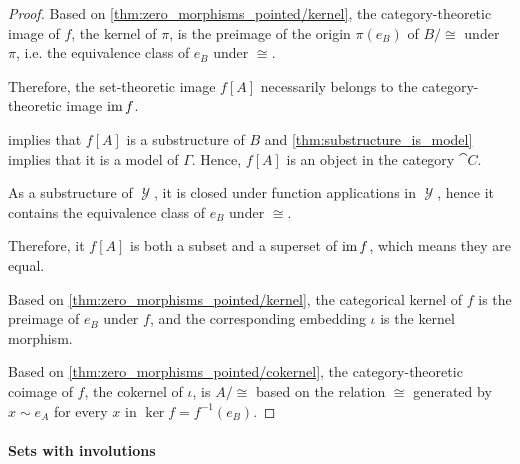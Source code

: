 \begin{proof}
  Based on \cref{thm:zero_morphisms_pointed/kernel}, the category-theoretic image of \( f \), the kernel of \( \pi \), is the preimage of the origin \( \pi(e_B) \) of \( B / {\cong} \) under \( \pi \), i.e. the equivalence class of \( e_B \) under \( {\cong} \).

  Therefore, the set-theoretic image \( f[A] \) necessarily belongs to the category-theoretic image \( \operatorname{im} f \).

   implies that \( f[A] \) is a substructure of \( B \) and \cref{thm:substructure_is_model} implies that it is a model of \( \Gamma \). Hence, \( f[A] \) is an object in the category \( \cat{C} \).

  As a substructure of \( \mscrY \), it is closed under function applications in \( \mscrY \), hence it contains the equivalence class of \( e_B \) under \( {\cong} \).

  Therefore, it \( f[A] \) is both a subset and a superset of \( \operatorname{im} f \), which means they are equal.

   Based on \cref{thm:zero_morphisms_pointed/kernel}, the categorical kernel of \( f \) is the preimage of \( e_B \) under \( f \), and the corresponding embedding \( \iota \) is the kernel morphism.

  Based on \cref{thm:zero_morphisms_pointed/cokernel}, the category-theoretic coimage of \( f \), the cokernel of \( \iota \), is \( A / {\cong} \) based on the relation \( {\cong} \) generated by \( x \sim e_A \) for every \( x \) in \( \ker f = f^{-1}(e_B) \).
\end{proof}

\paragraph{Sets with involutions}

